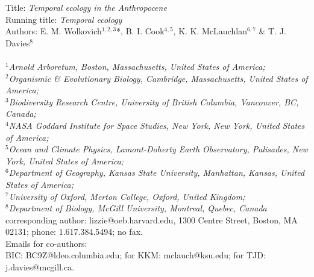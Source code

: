 \documentclass[11pt,a4paper,oneside]{article}
\begin{document}


\noindent Title: \emph{Temporal ecology in the Anthropocene}\\

\noindent Running title: \emph{Temporal ecology}\\

\noindent Authors: E. M. Wolkovich$^{1,2,3}$*, B. I. Cook$^{4,5}$, K. K. McLauchlan$^{6,7}$ \& T. J. Davies$^{8}$\\
\\
\noindent \emph{$^{1}$Arnold Arboretum, Boston, Massachusetts, United States of America; \\
$^{2}$Organismic \& Evolutionary Biology, Cambridge, Massachusetts, United States of America; \\
$^{3}$Biodiversity Research Centre, University of British Columbia, Vancouver, BC, Canada; \\
$^{4}$NASA Goddard Institute for Space Studies, New York, New York, United States of America; \\
$^{5}$Ocean and Climate  Physics, Lamont-Doherty Earth Observatory, Palisades, New York, United States of America; \\
$^{6}$Department of Geography, Kansas State University, Manhattan, Kansas, United States of America;\\
 $^{7}$University of Oxford, Merton College, Oxford, United Kingdom; \\
$^{8}$Department of Biology, McGill University, Montreal, Quebec, Canada}\\ %

\noindent *corresponding author: lizzie@oeb.harvard.edu, 1300 Centre Street, Boston, MA 02131; phone: 1.617.384.5494; no fax.\\
\noindent Emails for co-authors: \\
\noindent BIC: BC9Z@ldeo.columbia.edu; for KKM: mclauch@ksu.edu; for TJD: j.davies@mcgill.ca.\\
\end{document}
